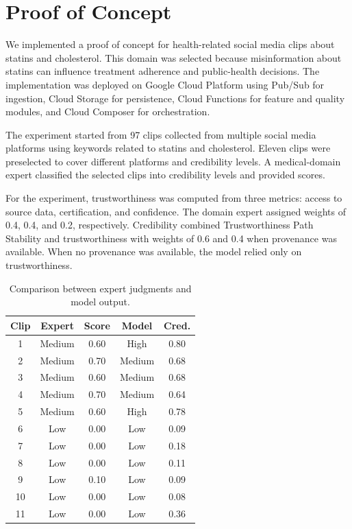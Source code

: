 \documentclass[sigconf, nonacm]{acmart}
\begin{document}
\section{Proof of Concept}

We implemented a proof of concept for health-related social media clips about
statins and cholesterol. This domain was selected because misinformation about
statins can influence treatment adherence and public-health decisions. The
implementation was deployed on Google Cloud Platform using Pub/Sub for ingestion,
Cloud Storage for persistence, Cloud Functions for feature and quality modules,
and Cloud Composer for orchestration.

The experiment started from 97 clips collected from multiple social media
platforms using keywords related to statins and cholesterol. Eleven clips were
preselected to cover different platforms and credibility levels. A medical-domain
expert classified the selected clips into credibility levels and provided scores.

For the experiment, trustworthiness was computed from three metrics: access to
source data, certification, and confidence. The domain expert assigned weights of
0.4, 0.4, and 0.2, respectively. Credibility combined Trustworthiness Path
Stability and trustworthiness with weights of 0.6 and 0.4 when provenance was
available. When no provenance was available, the model relied only on
trustworthiness.

\begin{table}[t]
  \caption{Comparison between expert judgments and model output.}
  \label{tab:results}
  \begin{tabular}{ccccc}
    \toprule
    Clip & Expert & Score & Model & Cred.\\
    \midrule
    1 & Medium & 0.60 & High & 0.80\\
    2 & Medium & 0.70 & Medium & 0.68\\
    3 & Medium & 0.60 & Medium & 0.68\\
    4 & Medium & 0.70 & Medium & 0.64\\
    5 & Medium & 0.60 & High & 0.78\\
    6 & Low & 0.00 & Low & 0.09\\
    7 & Low & 0.00 & Low & 0.18\\
    8 & Low & 0.00 & Low & 0.11\\
    9 & Low & 0.10 & Low & 0.09\\
    10 & Low & 0.00 & Low & 0.08\\
    11 & Low & 0.00 & Low & 0.36\\
    \bottomrule
  \end{tabular}
\end{table}
\end{document}
